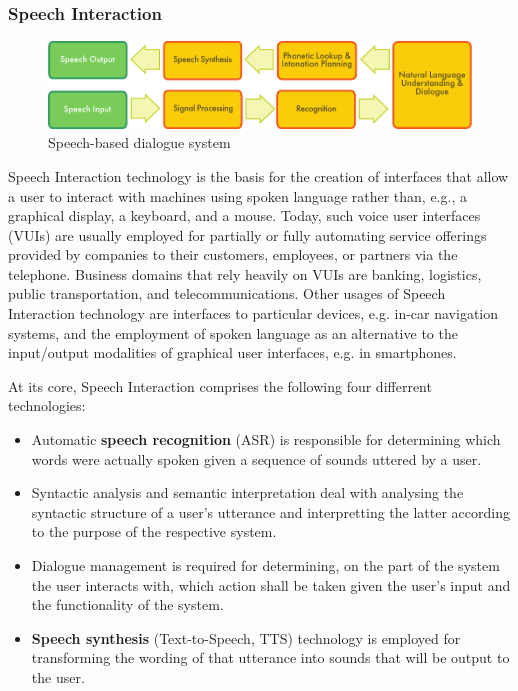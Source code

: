 \begin{multicols}{2}
\subsubsection{Speech Interaction}
\begin{figure}[htb]
  \center
  \includegraphics[width=\textwidth]{../_media/english/simple_speech-based_dialogue_architecture}
  \caption{Speech-based dialogue system}
  \label{fig:dialoguearch_en}
\end{figure}

Speech Interaction technology is the basis for the creation of interfaces that allow a user to interact with machines using spoken language rather than, e.g., a graphical display, a keyboard, and a mouse. Today, such voice user interfaces (VUIs) are usually employed for partially or fully automating service offerings provided by companies to their customers, employees, or partners via the telephone. Business domains that rely heavily on VUIs are banking, logistics, public transportation, and telecommunications. Other usages of Speech Interaction technology are interfaces to particular devices, e.g. in-car navigation systems, and the employment of spoken language as an alternative to the input/output modalities of graphical user interfaces, e.g. in smartphones.

At its core, Speech Interaction comprises the following four differrent technologies:

    \begin{itemize}
      \item Automatic \textbf{speech recognition} (ASR) is responsible for determining which words were actually spoken given a sequence of sounds uttered by a user.
      \item Syntactic analysis and 
semantic interpretation deal with analysing the syntactic structure of a user’s utterance and interpretting the latter according to the purpose of the respective system.
      \item Dialogue management is required for determining, on the part of the system the user interacts with, which action shall be taken given the user’s input and the functionality of the system.
      \item \textbf{Speech synthesis} (Text-to-Speech, TTS) technology is employed for transforming the wording of that utterance into sounds that will be output to the user. 


\end{itemize}
\end{multicols}
